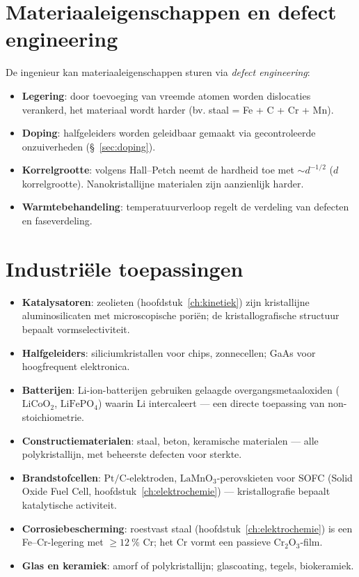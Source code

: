 \section{Materiaaleigenschappen en defect engineering}

De ingenieur kan materiaaleigenschappen sturen via \emph{defect engineering}:

\begin{itemize}
\item \textbf{Legering}: door toevoeging van vreemde atomen worden dislocaties verankerd, het materiaal wordt harder (bv. staal = Fe + C + Cr + Mn).
\item \textbf{Doping}: halfgeleiders worden geleidbaar gemaakt via gecontroleerde onzuiverheden (\S~\ref{sec:doping}).
\item \textbf{Korrelgrootte}: volgens Hall--Petch neemt de hardheid toe met $\sim d^{-1/2}$ ($d$ korrelgrootte). Nanokristallijne materialen zijn aanzienlijk harder.
\item \textbf{Warmtebehandeling}: temperatuurverloop regelt de verdeling van defecten en faseverdeling.
\end{itemize}

\section{Industri\"ele toepassingen}

\begin{itemize}
\item \textbf{Katalysatoren}: zeolieten (hoofdstuk~\ref{ch:kinetiek}) zijn kristallijne aluminosilicaten met microscopische pori\"en; de kristallografische structuur bepaalt vormselectiviteit.
\item \textbf{Halfgeleiders}: siliciumkristallen voor chips, zonnecellen; GaAs voor hoogfrequent elektronica.
\item \textbf{Batterijen}: Li-ion-batterijen gebruiken gelaagde overgangsmetaaloxiden ($\mathrm{LiCoO_2}$, $\mathrm{LiFePO_4}$) waarin Li intercaleert --- een directe toepassing van non-stoichiometrie.
\item \textbf{Constructiematerialen}: staal, beton, keramische materialen --- alle polykristallijn, met beheerste defecten voor sterkte.
\item \textbf{Brandstofcellen}: $\mathrm{Pt/C}$-elektroden, $\mathrm{LaMnO_3}$-perovskieten voor SOFC (Solid Oxide Fuel Cell, hoofdstuk~\ref{ch:elektrochemie}) --- kristallografie bepaalt katalytische activiteit.
\item \textbf{Corrosiebescherming}: roestvast staal (hoofdstuk~\ref{ch:elektrochemie}) is een Fe--Cr-legering met $\geq \SI{12}{\percent}$ Cr; het Cr vormt een passieve $\mathrm{Cr_2O_3}$-film.
\item \textbf{Glas en keramiek}: amorf of polykristallijn; glascoating, tegels, biokeramiek.
\end{itemize}


